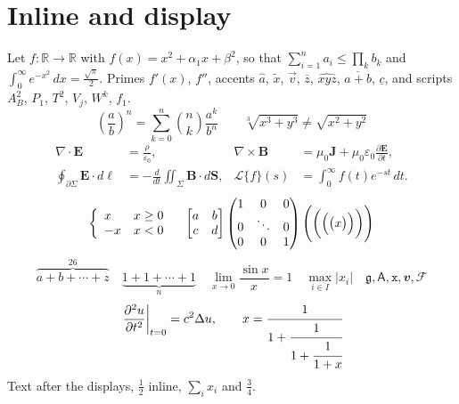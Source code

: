 \documentclass{article}
\begin{document}
\section{Inline and display}
Let $f\colon \mathbb{R}\to\mathbb{R}$ with $f(x)=x^2+\alpha_1 x+\beta^{2}$, so that
$\sum_{i=1}^{n} a_i \le \prod_{k} b_k$ and $\int_0^\infty e^{-x^2}\,dx=\frac{\sqrt{\pi}}{2}$.
Primes $f'(x)$, $f''$, accents $\hat a$, $\tilde{x}$, $\vec{v}$, $\bar z$, $\widehat{xyz}$,
$\overline{a+b}$, $\underline{c}$, and scripts $A^2_B$, $P_1$, $T^2$, $V_j$, $W^k$, $f_1$.
\begin{equation}
  \left( \frac{a}{b} \right)^{n} = \sum_{k=0}^{n} \binom{n}{k} \frac{a^{k}}{b^{n}}
  \qquad \sqrt[3]{x^3+y^3} \ne \sqrt{x^2+y^2}
\end{equation}
\begin{align}
  \nabla\cdot\symbf{E} &= \frac{\rho}{\varepsilon_0}, &
  \nabla\times\symbf{B} &= \mu_0\symbf{J}+\mu_0\varepsilon_0\frac{\partial \symbf{E}}{\partial t}, \\
  \oint_{\partial\Sigma} \symbf{E}\cdot d\symbf{\ell} &= -\frac{d}{dt}\iint_{\Sigma}\symbf{B}\cdot d\symbf{S}, &
  \mathcal{L}\{f\}(s) &= \int_0^\infty f(t)e^{-st}\,dt .
\end{align}
\[
  \left\{ \begin{array}{ll} x & x\ge 0 \\ -x & x<0 \end{array} \right.
  \quad
  \left[ \begin{matrix} a & b \\ c & d \end{matrix} \right]
  \begin{pmatrix} 1 & 0 & 0 \\ 0 & \ddots & 0 \\ 0 & 0 & 1 \end{pmatrix}
  \Biggl( \biggl( \Bigl( \bigl( x \bigr) \Bigr) \biggr) \Biggr)
\]
\[
  \overbrace{a+b+\cdots+z}^{26} \quad \underbrace{1+1+\cdots+1}_{n}
  \quad \lim_{x\to 0}\frac{\sin x}{x}=1 \quad \max_{i\in I} \lvert x_i \rvert
  \quad \mathfrak{g}, \mathsf{A}, \mathtt{x}, \mathbfit{v}, \mathscr{F}
\]
\begin{gather*}
  \left. \frac{\partial^2 u}{\partial t^2} \right|_{t=0} = c^2 \Delta u, \qquad
  x = \cfrac{1}{1+\cfrac{1}{1+\cfrac{1}{1+x}}}
\end{gather*}
Text after the displays, $\frac{1}{2}$ inline, $\displaystyle\sum_{i}x_i$ and $\tfrac{3}{4}$.
\end{document}
